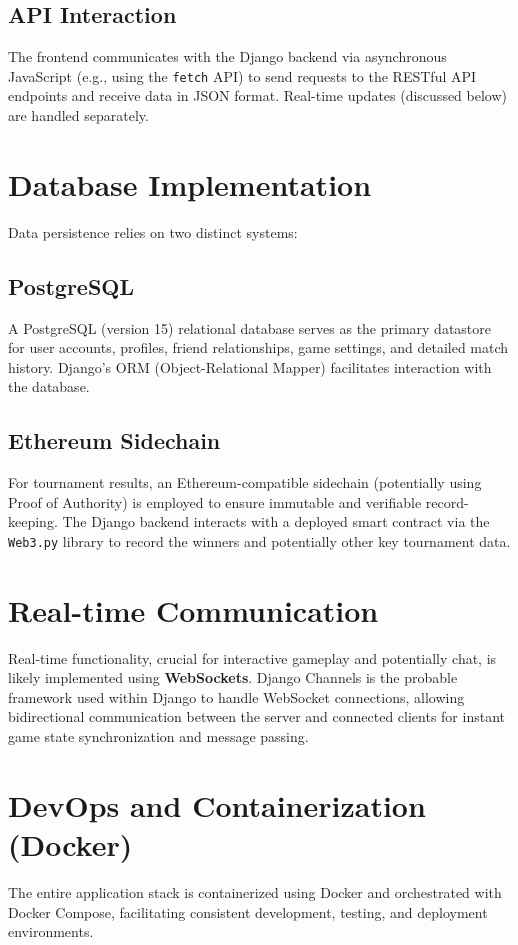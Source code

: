 \subsection{API Interaction}
The frontend communicates with the Django backend via asynchronous JavaScript (e.g., using the \texttt{fetch} API) to send requests to the RESTful API endpoints and receive data in JSON format. Real-time updates (discussed below) are handled separately.

\section{Database Implementation}
\label{sec:database_impl}
Data persistence relies on two distinct systems:

\subsection{PostgreSQL}
A PostgreSQL (version 15) relational database serves as the primary datastore for user accounts, profiles, friend relationships, game settings, and detailed match history. Django's ORM (Object-Relational Mapper) facilitates interaction with the database.

\subsection{Ethereum Sidechain}
For tournament results, an Ethereum-compatible sidechain (potentially using Proof of Authority) is employed to ensure immutable and verifiable record-keeping. The Django backend interacts with a deployed smart contract via the \texttt{Web3.py} library to record the winners and potentially other key tournament data.

\section{Real-time Communication}
\label{sec:realtime_impl}
Real-time functionality, crucial for interactive gameplay and potentially chat, is likely implemented using \textbf{WebSockets}. Django Channels is the probable framework used within Django to handle WebSocket connections, allowing bidirectional communication between the server and connected clients for instant game state synchronization and message passing.

\section{DevOps and Containerization (Docker)}
\label{sec:devops_impl}
The entire application stack is containerized using Docker and orchestrated with Docker Compose, facilitating consistent development, testing, and deployment environments.


